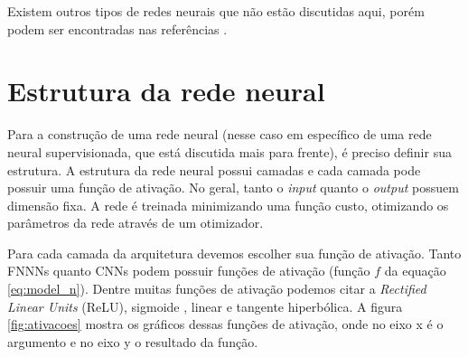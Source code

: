 \documentclass[a4paper,12pt,oneside]{book}
\begin{document}

\par Existem outros tipos de redes neurais que não estão discutidas aqui, porém podem ser encontradas nas referências \cite{rbfbook, RNN_fund}.

\section{Estrutura da rede neural}

\par Para a construção de uma rede neural (nesse caso em específico de uma rede neural supervisionada, que está discutida mais para frente), é preciso definir sua estrutura. A estrutura da rede neural possui camadas e cada camada pode possuir uma função de ativação. No geral, tanto o \textit{input} quanto o \textit{output} possuem dimensão fixa. A rede é treinada minimizando uma função custo, otimizando os parâmetros da rede através de um otimizador.


\par Para cada camada da arquitetura devemos escolher sua função de ativação. Tanto FNNNs quanto CNNs podem possuir funções de ativação (função $f$ da equação \ref{eq:model_n}). Dentre muitas funções de ativação podemos citar a \textit{Rectified Linear Units} (ReLU)\cite{RELU}, sigmoide \cite{sigmoid_act}, linear e tangente hiperbólica\cite{act_comp}. A figura \ref{fig:ativacoes} mostra os gráficos dessas funções de ativação, onde no eixo x é o argumento e no eixo y o resultado da função.
\end{document}
